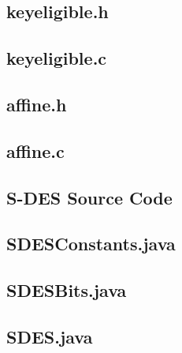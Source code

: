 \documentclass[]{article}
\begin{document}
\subsection*{keyeligible.h}
\pagebreak{}
\subsection*{keyeligible.c}
\pagebreak{}
\subsection*{affine.h}
\pagebreak{}
\subsection*{affine.c}
\pagebreak{}


\vspace*{-0.8cm}
\begin{center}
	\section*{S-DES Source Code}
 \end{center}

\subsection*{SDESConstants.java}
\pagebreak{}
\subsection*{SDESBits.java}
\pagebreak{}
\subsection*{SDES.java}
\pagebreak{}

\end{document}
